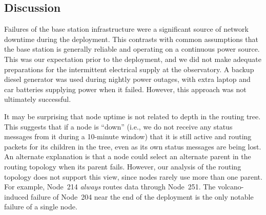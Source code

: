 \subsection{Discussion}

Failures of the base station infrastructure were a significant source of
network downtime during the deployment. This contrasts with common
assumptions that the base station is generally reliable and operating on a
continuous power source. This was our expectation prior to the deployment,
and we did not make adequate preparations for the intermittent electrical
supply at the observatory. A backup diesel generator was used during nightly
power outages, with extra laptop and car batteries supplying power when it
failed. However, this approach was not ultimately successful.

It may be surprising that node uptime is not related to depth in the routing
tree. This suggests that if a node is ``down'' (i.e., we do not receive any
status messages from it during a 10-minute window) that it is still active
and routing packets for its children in the tree, even as its own status
messages are being lost. An alternate explanation is that a node could select
an alternate parent in the routing topology when its parent fails. However,
our analysis of the routing topology does not support this view, since nodes
rarely use more than one parent. For example, Node~214 \textit{always} routes
data through Node~251. The volcano-induced failure of Node~204 near the end
of the deployment is the only notable failure of a single node.
